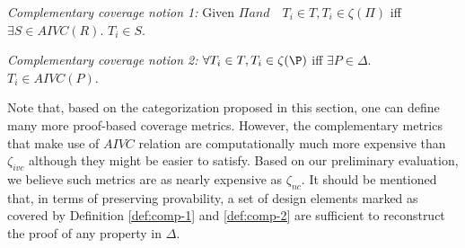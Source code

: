 \begin{definition} {\emph{Complementary coverage notion 1:}}
  \label{def:comp-1}
   Given $ \Pi and \quad T_i \in T,  T_i \in \zeta(\Pi)$ iff $ \exists S
   \in AIVC(R)$. $T_i \in S$.
\end{definition}

\begin{definition} {\emph{Complementary coverage notion 2:}}
  \label{def:comp-2}
   $\forall T_i \in T,  T_i \in \zeta(\P)$ iff $\exists P \in \Delta$. $T_i \in AIVC(P)$.
\end{definition}

Note that, based on the categorization proposed in this section, one can define many more proof-based coverage metrics. However, the complementary metrics that make use of $AIVC$ relation are computationally much more expensive than $\zeta_{ivc}$ although they might be easier to satisfy. Based on our preliminary evaluation, we believe such metrics are as nearly expensive as $\zeta_{nc}$. It should be mentioned that, in terms of preserving provability, a set of design elements marked as covered by Definition \ref{def:comp-1} and \ref{def:comp-2} are
sufficient to reconstruct the proof of any property in $\Delta$.



